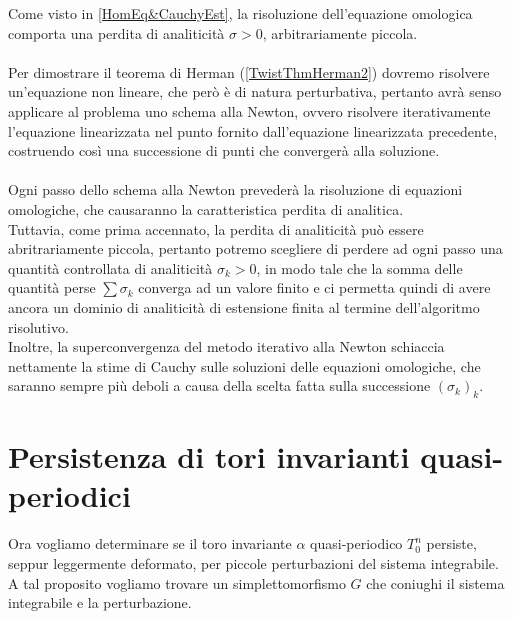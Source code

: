 \documentclass[twoside, 11pt]{amsbook}
\newcommand{\0}{{(0)}}
\newcommand{\3}{{(3)}}
\theoremstyle{colonplain}
\theoremstyle{colondefinition}
\theoremstyle{colonremark}
\numberwithin{equation}{chapter}
\begin{document}
Come visto in \ref{HomEq&CauchyEst}, la risoluzione dell'equazione omologica comporta una perdita di analiticità $\sigma > 0$, arbitrariamente piccola. \\ \\
Per dimostrare il teorema di Herman (\ref{TwistThmHerman2}) dovremo risolvere un'equazione non lineare, che però è di natura perturbativa, pertanto avrà senso applicare al problema uno schema alla Newton, ovvero risolvere iterativamente l'equazione linearizzata nel punto fornito dall'equazione linearizzata precedente, costruendo così una successione di punti che convergerà alla soluzione. \\ \\
Ogni passo dello schema alla Newton prevederà la risoluzione di equazioni omologiche, che causaranno la caratteristica perdita di analitica. \\
Tuttavia, come prima accennato, la perdita di analiticità può essere abritrariamente piccola, pertanto potremo scegliere di perdere ad ogni passo una quantità controllata di analiticità $\sigma_k > 0$, in modo tale che la somma delle quantità perse $\sum \sigma_k$ converga ad un valore finito e ci permetta quindi di avere ancora un dominio di analiticità di estensione finita al termine dell'algoritmo risolutivo. \\
Inoltre, la superconvergenza del metodo iterativo alla Newton schiaccia nettamente la stime di Cauchy sulle soluzioni delle equazioni omologiche, che saranno sempre più deboli a causa della scelta fatta sulla successione $(\sigma_k)_k$.

\chapter{Persistenza di tori invarianti quasi-periodici}
Ora vogliamo determinare se il toro invariante $\alpha$ quasi-periodico $T^n_0$ persiste, seppur leggermente deformato, per piccole perturbazioni del sistema integrabile. \\
A tal proposito vogliamo trovare un simplettomorfismo $G$ che coniughi il sistema integrabile e la perturbazione.
\end{document}
